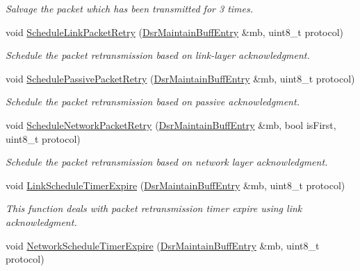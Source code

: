 \begin{DoxyCompactItemize}
\begin{DoxyCompactList}\small\item\em Salvage the packet which has been transmitted for 3 times. \end{DoxyCompactList}\item 
void \hyperlink{classns3_1_1dsr_1_1DsrRouting_a947d831bc0964240b1a41b3a09832eff}{Schedule\+Link\+Packet\+Retry} (\hyperlink{classns3_1_1dsr_1_1DsrMaintainBuffEntry}{Dsr\+Maintain\+Buff\+Entry} \&mb, uint8\+\_\+t protocol)
\begin{DoxyCompactList}\small\item\em Schedule the packet retransmission based on link-\/layer acknowledgment. \end{DoxyCompactList}\item 
void \hyperlink{classns3_1_1dsr_1_1DsrRouting_abfdfa37822a492971fdf24540b635039}{Schedule\+Passive\+Packet\+Retry} (\hyperlink{classns3_1_1dsr_1_1DsrMaintainBuffEntry}{Dsr\+Maintain\+Buff\+Entry} \&mb, uint8\+\_\+t protocol)
\begin{DoxyCompactList}\small\item\em Schedule the packet retransmission based on passive acknowledgment. \end{DoxyCompactList}\item 
void \hyperlink{classns3_1_1dsr_1_1DsrRouting_a6a18c6baa374d5e6a68f8952d1afdb13}{Schedule\+Network\+Packet\+Retry} (\hyperlink{classns3_1_1dsr_1_1DsrMaintainBuffEntry}{Dsr\+Maintain\+Buff\+Entry} \&mb, bool is\+First, uint8\+\_\+t protocol)
\begin{DoxyCompactList}\small\item\em Schedule the packet retransmission based on network layer acknowledgment. \end{DoxyCompactList}\item 
void \hyperlink{classns3_1_1dsr_1_1DsrRouting_ab0ce215bf5359f4d6d4541b8a479007c}{Link\+Schedule\+Timer\+Expire} (\hyperlink{classns3_1_1dsr_1_1DsrMaintainBuffEntry}{Dsr\+Maintain\+Buff\+Entry} \&mb, uint8\+\_\+t protocol)
\begin{DoxyCompactList}\small\item\em This function deals with packet retransmission timer expire using link acknowledgment. \end{DoxyCompactList}\item 
void \hyperlink{classns3_1_1dsr_1_1DsrRouting_aabcdf59bcb4907718986626a7a402dad}{Network\+Schedule\+Timer\+Expire} (\hyperlink{classns3_1_1dsr_1_1DsrMaintainBuffEntry}{Dsr\+Maintain\+Buff\+Entry} \&mb, uint8\+\_\+t protocol)

\end{DoxyCompactItemize}
